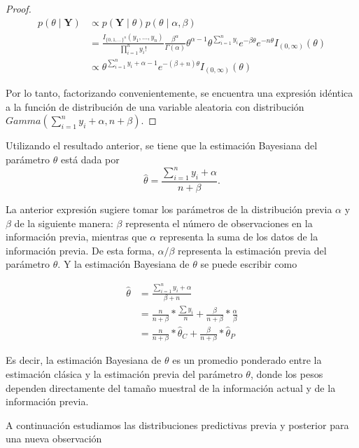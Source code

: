 \documentclass[
  12pt,
  spanish,
]{book}
\theoremstyle{definition}
\theoremstyle{definition}
\theoremstyle{definition}
\theoremstyle{definition}
\theoremstyle{remark}
\begin{document}
\begin{proof}
\iffalse{} {Prueba. } \fi{}\begin{align*}
p(\theta \mid \mathbf{Y})&\propto p(\mathbf{Y} \mid \theta)p(\theta \mid \alpha,\beta)\\
&=\frac{I_{\{0,1,\ldots\}^n}(y_1,\ldots,y_n)}{\prod_{i=1}^ny_i!}\frac{\beta^\alpha}{\Gamma(\alpha)}
\theta^{\alpha-1}\theta^{\sum_{i=1}^ny_i}e^{-\beta\theta}e^{-n\theta}I_{(0,\infty)}(\theta)\\
&\propto \theta^{\sum_{i=1}^ny_i+\alpha-1}e^{-(\beta+n)\theta}I_{(0,\infty)}(\theta)
\end{align*}

Por lo tanto, factorizando convenientemente, se encuentra una expresión idéntica a la función de distribución de una variable aleatoria con distribución \(Gamma(\sum_{i=1}^ny_i+\alpha,n+\beta)\).
\end{proof}

Utilizando el resultado anterior, se tiene que la estimación Bayesiana del parámetro \(\theta\) está dada por
\begin{equation*}
\hat{\theta}=\frac{\sum_{i=1}^ny_i+\alpha}{n+\beta}.
\end{equation*}

La anterior expresión sugiere tomar los parámetros de la distribución previa \(\alpha\) y \(\beta\) de la siguiente manera: \(\beta\) representa el número de observaciones en la información previa, mientras que \(\alpha\) representa la suma de los datos de la información previa. De esta forma, \(\alpha/\beta\) representa la estimación previa del parámetro \(\theta\). Y la estimación Bayesiana de \(\theta\) se puede escribir como

\begin{align*}
\hat{\theta}&=\frac{\sum_{i=1}^ny_i+\alpha}{\beta+n}\\
&=\frac{n}{n+\beta}*\frac{\sum y_i}{n}+\frac{\beta}{n+\beta}*\frac{\alpha}{\beta}\\
&=\frac{n}{n+\beta}*\hat{\theta}_C+\frac{\beta}{n+\beta}*\hat{\theta}_P
\end{align*}

Es decir, la estimación Bayesiana de \(\theta\) es un promedio ponderado entre la estimación clásica y la estimación previa del parámetro \(\theta\), donde los pesos dependen directamente del tamaño muestral de la información actual y de la información previa.

A continuación estudiamos las distribuciones predictivas previa y posterior para una nueva observación
\end{document}
